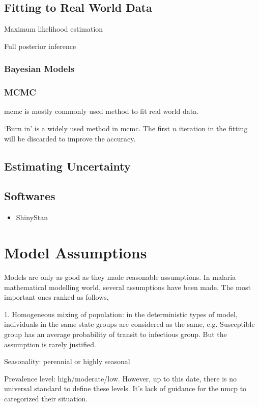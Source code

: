 \documentclass[a4paper, 12pt, twoside]{article}
\begin{document}
\subsection{Fitting to Real World Data}

Maximum likelihood estimation

Full posterior inference

\subsubsection{Bayesian Models}

\subsubsection{MCMC}

\gls{mcmc} is mostly commonly used method to fit real world data.

`Burn in' is a widely used method in \gls{mcmc}. The first $n$ iteration in the fitting will be discarded to improve the accuracy.

\subsection{Estimating Uncertainty}

\subsection{Softwares}

\begin{itemize}
  \item ShinyStan
\end{itemize}

\section{Model Assumptions}
Models are only as good as they made reasonable assumptions. In malaria mathematical modelling world, several assumptions have been made. The most important ones ranked as follows,

1. Homogeneous mixing of population: in the deterministic types of model, individuals in the same state groups are considered as the same, e.g. Susceptible group has an average probability of transit to infectious group. But the assumption is rarely justified.

Seasonality: perennial or highly seasonal 

Prevalence level: high/moderate/low. 
However, up to this date, there is no universal standard to define these levels.
It's lack of guidance for the \gls{nmcp} to categorized their situation.
\end{document}
